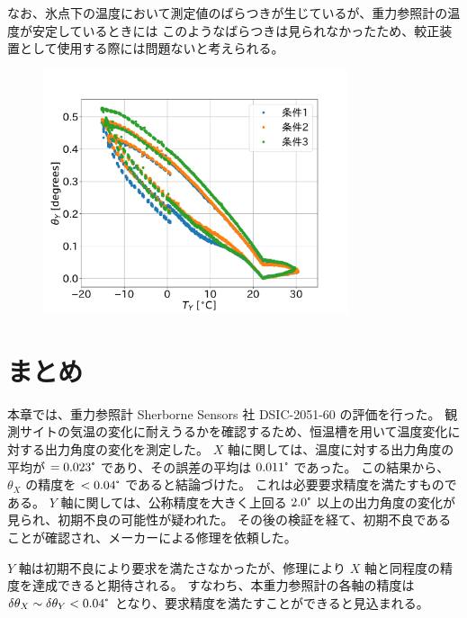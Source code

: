 \documentclass[../../main.tex]{subfiles}
\begin{document}
なお、氷点下の温度において測定値のばらつきが生じているが、重力参照計の温度が安定しているときには
このようなばらつきは見られなかったため、較正装置として使用する際には問題ないと考えられる。
\begin{figure}[H]
    \centering
    \includegraphics[width=0.8\textwidth]{tiltsensor/angleY_huryou_test.pdf}
    \label{fig:angleY_huryou_test}
\end{figure}
\section{まとめ}
本章では、重力参照計 Sherborne Sensors 社 DSIC-2051-60 の評価を行った。
観測サイトの気温の変化に耐えうるかを確認するため、恒温槽を用いて温度変化に対する出力角度の変化を測定した。
$X$ 軸に関しては、温度に対する出力角度の平均が $=0.023\tcdegree$ であり、その誤差の平均は $0.011\tcdegree$ であった。
この結果から、 $\theta_{X}$ の精度を $<0.04\tcdegree$ であると結論づけた。
これは必要要求精度を満たすものである。
$Y$ 軸に関しては、公称精度を大きく上回る $2.0\tcdegree$ 以上の出力角度の変化が見られ、初期不良の可能性が疑われた。
その後の検証を経て、初期不良であることが確認され、メーカーによる修理を依頼した。

$Y$ 軸は初期不良により要求を満たさなかったが、修理により $X$ 軸と同程度の精度を達成できると期待される。
すなわち、本重力参照計の各軸の精度は $\delta\theta_X\sim\delta\theta_Y<0.04\tcdegree$ となり、要求精度を満たすことができると見込まれる。
\end{document}
